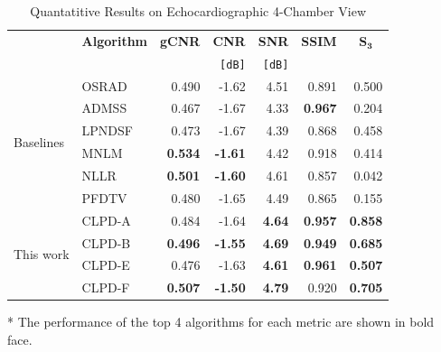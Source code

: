 \begin{table}
  \centering
  \caption{Quantatitive Results on Echocardiographic 4-Chamber View}\label{table:cardiac3}
  \setlength{\tabcolsep}{3pt}
  \begin{threeparttable}
  \begin{tabular}{llrrrrr}
    \toprule
    & \multicolumn{1}{c}{\textbf{Algorithm}}
    & \multicolumn{1}{c}{\textbf{gCNR}}
    & \multicolumn{1}{c}{\textbf{CNR}}
    & \multicolumn{1}{c}{\textbf{SNR}}
    & \multicolumn{1}{c}{\textbf{SSIM}}
    & \multicolumn{1}{c}{\(\mathbf{S_{3}}\)}\\
    & \multicolumn{1}{c}{}
    & \multicolumn{1}{c}{}
    & \texttt{[dB]}
    & \texttt{[dB]}
    & \multicolumn{1}{c}{}
    & \multicolumn{1}{c}{} \\\midrule
    \multirow{6}{*}{Baselines}
    & OSRAD  & 0.490          & -1.62          & 4.51          & 0.891          & 0.500 \\
    & ADMSS  & 0.467          & -1.67          & 4.33          & \textbf{0.967} & 0.204 \\
    & LPNDSF & 0.473          & -1.67          & 4.39          & 0.868          & 0.458 \\
    & MNLM   & \textbf{0.534} & \textbf{-1.61} & 4.42          & 0.918          & 0.414 \\
    & NLLR   & \textbf{0.501} & \textbf{-1.60} & 4.61          & 0.857          & 0.042\\
    & PFDTV  & 0.480          & -1.65          & 4.49          & 0.865          & 0.155 \\\midrule
    \multirow{4}{*}{This work}
    & CLPD-A & 0.484          & -1.64          & \textbf{4.64} & \textbf{0.957} & \textbf{0.858} \\
    & CLPD-B & \textbf{0.496} & \textbf{-1.55} & \textbf{4.69} & \textbf{0.949} & \textbf{0.685} \\
    & CLPD-E & 0.476          & -1.63          & \textbf{4.61} & \textbf{0.961} & \textbf{0.507} \\
    & CLPD-F & \textbf{0.507} & \textbf{-1.50} & \textbf{4.79} & 0.920          & \textbf{0.705} \\\bottomrule
  \end{tabular}
  \begin{tablenotes}
    \item[*] The performance of the top 4 algorithms for each metric are shown in bold face.
  \end{tablenotes}
  \end{threeparttable}
  \vspace{-0.2in}
\end{table}
%
